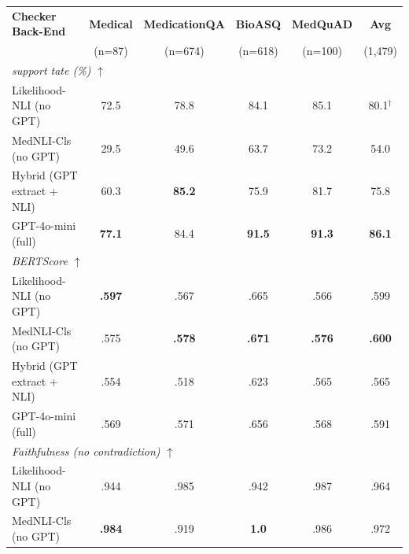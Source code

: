 \documentclass[11pt]{article}
\begin{document}
 \begin{table}[t]
\centering\small
\setlength{\tabcolsep}{4pt}
\begin{tabular}{@{}l cccc|c@{}}
\toprule
\textbf{Checker Back-End}
  & \textbf{Medical} & \textbf{MedicationQA} & \textbf{BioASQ}
  & \textbf{MedQuAD} & \textbf{Avg} \\
  &  (n=87) & (n=674) & (n=618) & (n=100) & (1{,}479) \\
\midrule
\multicolumn{6}{l}{\textit{support tate (\%) $\uparrow$}} \\
Likelihood-NLI (no GPT)
  & \cellcolor{g3}72.5 & \cellcolor{g2}78.8 & \cellcolor{g3}84.1 & \cellcolor{g3}85.1 & \cellcolor{g3}80.1$^{\dagger}$ \\
MedNLI-Cls (no GPT)
  & \cellcolor{g1}29.5 & \cellcolor{g1}49.6 & \cellcolor{g1}63.7 & \cellcolor{g1}73.2 & \cellcolor{g1}54.0 \\
Hybrid (GPT extract + NLI)
  & \cellcolor{g2}60.3 & \cellcolor{g4}\textbf{85.2} & \cellcolor{g2}75.9 & \cellcolor{g2}81.7 & \cellcolor{g2}75.8 \\
GPT-4o-mini (full)
  & \cellcolor{g4}\textbf{77.1} & \cellcolor{g3}84.4 & \cellcolor{g4}\textbf{91.5} & \cellcolor{g4}\textbf{91.3} & \cellcolor{g4}\textbf{86.1} \\
\midrule
\multicolumn{6}{l}{\textit{BERTScore $\uparrow$}} \\
Likelihood-NLI (no GPT)
  & \cellcolor{g4}\textbf{.597} & \cellcolor{g2}.567 & \cellcolor{g3}.665 & \cellcolor{g2}.566 & \cellcolor{g3}.599 \\
MedNLI-Cls (no GPT)
  & \cellcolor{g3}.575 & \cellcolor{g4}\textbf{.578} & \cellcolor{g4}\textbf{.671} & \cellcolor{g4}\textbf{.576} & \cellcolor{g4}\textbf{.600} \\
Hybrid (GPT extract + NLI)
  & \cellcolor{g1}.554 & \cellcolor{g1}.518 & \cellcolor{g1}.623 & \cellcolor{g1}.565 & \cellcolor{g1}.565 \\
GPT-4o-mini (full)
  & \cellcolor{g2}.569 & \cellcolor{g3}.571 & \cellcolor{g2}.656 & \cellcolor{g3}.568 & \cellcolor{g2}.591 \\
\midrule
\multicolumn{6}{l}{\textit{Faithfulness (no contradiction) $\uparrow$}} \\
Likelihood-NLI (no GPT)
  & \cellcolor{g1}.944 & \cellcolor{g3}.985 & \cellcolor{g1}.942 & \cellcolor{g2}.987 & \cellcolor{g1}.964 \\
MedNLI-Cls (no GPT)
  & \cellcolor{g4}\textbf{.984} & \cellcolor{g1}.919 & \cellcolor{g4}\textbf{1.0} & \cellcolor{g1}.986 & \cellcolor{g2}.972 \\

\end{tabular}
\end{table}
\end{document}
